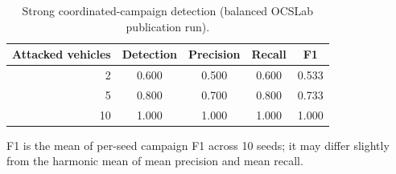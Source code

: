 \begin{table}[t]
\centering
\caption{Strong coordinated-campaign detection (balanced OCSLab publication run).}
\label{tab:verified_strong_campaign_detection}
\begin{tabular}{@{}rcccc@{}}
\toprule
Attacked vehicles & Detection & Precision & Recall & F1 \\
\midrule
2 & 0.600 & 0.500 & 0.600 & 0.533 \\
5 & 0.800 & 0.700 & 0.800 & 0.733 \\
10 & 1.000 & 1.000 & 1.000 & 1.000 \\
\bottomrule
\end{tabular}
\begin{flushleft}
\footnotesize F1 is the mean of per-seed campaign F1 across 10 seeds; it may differ slightly from the harmonic mean of mean precision and mean recall.
\end{flushleft}
\end{table}
